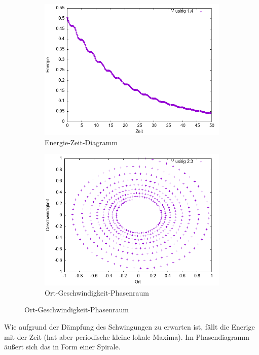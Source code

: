 \documentclass[
    oneside,
    ngerman,
    footinclude=false,
    captions=tableheading,
    DIV=12
]{scrartcl}
\begin{document}
            \begin{figure}[H]
            \centering
            \begin{subfigure}[b]{0.45\textwidth}
                \centering
                \includegraphics[width=\textwidth]{Bilddateien/LLA1(a)-01-E.png}
                \caption{Energie-Zeit-Diagramm}
                \label{fig:LLA1(a)-01-0-E}
            \end{subfigure}
            \hfill
            \begin{subfigure}[b]{0.45\textwidth}
                \centering
                \includegraphics[width=\textwidth]{Bilddateien/LLA1(a)-01-0-xv.png}
                \caption{Ort-Geschwindigkeit-Phasenraum}
                \label{fig:LLA1(a)-01-0-xv}
            \end{subfigure}
            \end{figure}
            Wie aufgrund der Dämpfung des Schwingungen zu erwarten ist, fällt die Enerige mit der Zeit (hat aber periodische kleine lokale Maxima). Im Phasendiagramm äußert sich das in Form einer Spirale.
            \newpage
\end{document}
